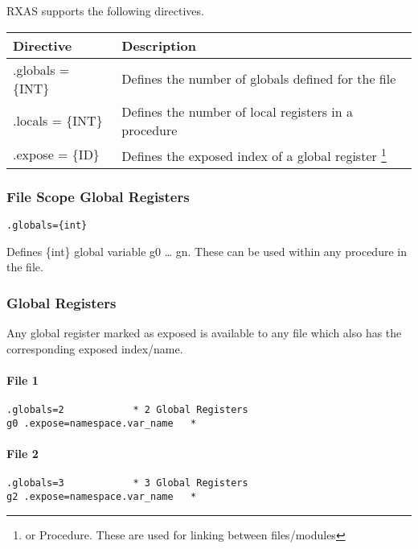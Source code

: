 RXAS supports the following directives.

\begin{longtable}[]{@{}ll@{}}
\toprule
Directive & Description \\
\midrule
\endhead
.globals = \{INT\} & Defines the number of globals defined for the
file \\
.locals = \{INT\} & Defines the number of local registers in a
procedure \\
.expose = \{ID\} & Defines the exposed index of a global register
\footnote{or Procedure. These are used for linking between files/modules} \\
\bottomrule
\end{longtable}

\hypertarget{file-scope-global-registers}{%
\subsubsection{File Scope Global
Registers}\label{file-scope-global-registers}}

\begin{verbatim}
.globals={int}
\end{verbatim}

Defines \{int\} global variable g0 \ldots{} gn. These can be used within
any procedure in the file.

\hypertarget{global-registers}{%
\subsubsection{Global Registers}\label{global-registers}}

Any global register marked as exposed is available to any file which
also has the corresponding exposed index/name.

\hypertarget{file-1}{%
\paragraph{File 1}\label{file-1}}

\begin{verbatim}
.globals=2            * 2 Global Registers
g0 .expose=namespace.var_name   * 
\end{verbatim}

\hypertarget{file-2}{%
\paragraph{File 2}\label{file-2}}

\begin{verbatim}
.globals=3            * 3 Global Registers
g2 .expose=namespace.var_name   * 
\end{verbatim}

